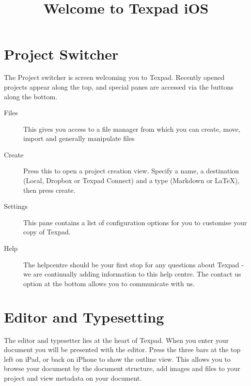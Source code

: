 \documentclass[11pt]{article}
\title{Welcome to Texpad iOS}
\begin{document}
\section{Project Switcher}

The Project switcher is screen welcoming you to Texpad. Recently opened projects appear along the top, and special panes are accessed via the buttons along the bottom.

\begin{description}
  \item[Files] This gives you access to a file manager from which you can create, move, import and generally manipulate files
  \item[Create] Press this to open a project creation view.  Specify a name, a destination (Local, Dropbox or Texpad Connect) and a type (Markdown or LaTeX), then press create.
  \item[Settings] This pane contains a list of configuration options for you to customise your copy of Texpad.
  \item[Help] The helpcentre should be your first stop for any questions about Texpad - we are continually adding information to this help centre.  The contact us option at the bottom allows you to communicate with us.
\end{description}

\section{Editor and Typesetting}
  The editor and typesetter lies at the heart of Texpad.  When you enter your document you will be presented with the editor.  Press the three bars at the top left on iPad, or back on iPhone to show the outline view.  This allows you to browse your document by the document structure, add images and files to your project and view metadata on your document.
\end{document}
